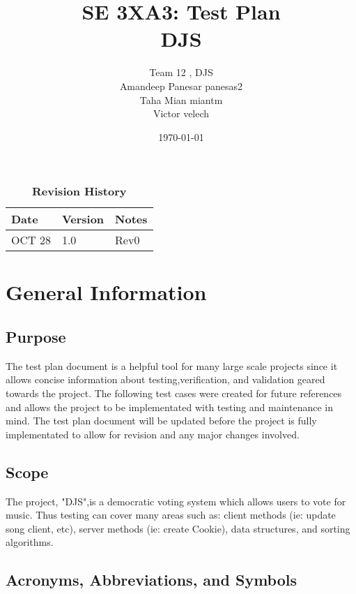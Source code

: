 \documentclass[12pt, titlepage]{article}
\title{SE 3XA3: Test Plan\\DJS}
\author{Team 12 , DJS
		\\ Amandeep Panesar panesas2
		\\ Taha Mian miantm
		\\ Victor velech
}
\date{\today}
\begin{document}
\maketitle

\tableofcontents
\listoftables
\listoffigures

\begin{table}[bp]
\caption{\bf Revision History}
\begin{tabularx}{\textwidth}{p{3cm}p{2cm}X}
\toprule {\bf Date} & {\bf Version} & {\bf Notes}\\
\midrule
OCT 28 & 1.0 & Rev0\\

\bottomrule
\end{tabularx}
\end{table}

\newpage



\section{General Information}

\subsection{Purpose}
The test plan document is a helpful tool for many large scale projects since it allows concise information about testing,verification, and validation geared towards the project. The following test cases were created for future references and allows the project to be implementated with testing and maintenance in mind. The test plan document will be updated before the project is fully implementated to allow for revision and any major changes involved.

\subsection{Scope}
The project, "DJS",is a democratic voting system which allows users to vote for music. Thus testing can cover many areas such as: client methods (ie: update song client, etc), server methods (ie: create Cookie), data structures, and sorting algorithms. 

\subsection{Acronyms, Abbreviations, and Symbols}
	
\end{document}
